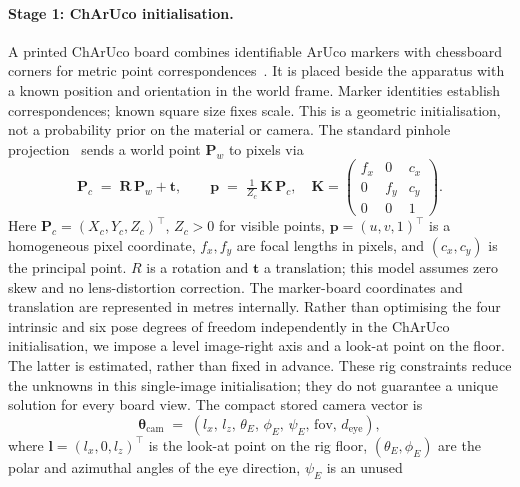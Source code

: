 \paragraph{Stage 1: ChArUco initialisation.}
A printed ChArUco
board combines identifiable ArUco markers with chessboard corners
for metric point correspondences~\cite{garrido2014automatic,garrido2016generation}.
It is placed beside the apparatus with a known position and orientation
in the world frame. Marker identities establish correspondences; known
square size fixes scale. This is a geometric initialisation, not a
probability prior on the material or camera. The standard
pinhole projection~\cite{hartley2004multiple} sends a world point
$\mathbf{P}_{w}$ to pixels via
\begin{equation}
\label{eq:pinhole}
    \mathbf{P}_{c} \;=\; \mathbf{R}\,\mathbf{P}_{w} + \mathbf{t},
    \qquad
    \mathbf{p} \;=\; \tfrac{1}{Z_{c}}\,\mathbf{K}\,\mathbf{P}_{c},
    \quad
    \mathbf{K} = \begin{pmatrix}
          f_{x} & 0     & c_{x} \\
          0     & f_{y} & c_{y} \\
          0     & 0     & 1
        \end{pmatrix}.
\end{equation}
Here $\mathbf P_c=(X_c,Y_c,Z_c)^\top$, $Z_c>0$ for visible
points, $\mathbf p=(u,v,1)^\top$ is a homogeneous pixel coordinate,
$f_x,f_y$ are focal lengths in pixels, and $(c_x,c_y)$ is the principal
point. $R$ is a rotation and $\mathbf t$ a translation; this model
assumes zero skew and no lens-distortion correction. The marker-board
coordinates and translation are represented in metres internally.
Rather than optimising the four intrinsic and six pose degrees of
freedom independently in the
ChArUco initialisation, we impose a level image-right axis and a look-at point on the floor.
The latter is estimated, rather than fixed in advance. These rig
constraints reduce the unknowns in this single-image initialisation;
they do not guarantee a unique solution for every board view. The
compact stored camera vector is
\begin{equation}
\label{eq:theta-cam}
    \boldsymbol{\theta}_{\mathrm{cam}}
    \;=\;
    (l_{x},\,l_{z},\,\theta_{E},\,\phi_{E},\,\psi_E,\,
    \mathrm{fov},\,d_{\mathrm{eye}}),
\end{equation}
where $\mathbf{l} = (l_{x}, 0, l_{z})^{\!\top}$ is the look-at point
on the rig floor, $(\theta_{E}, \phi_{E})$ are the polar and
azimuthal angles of the eye direction, $\psi_E$ is an unused
